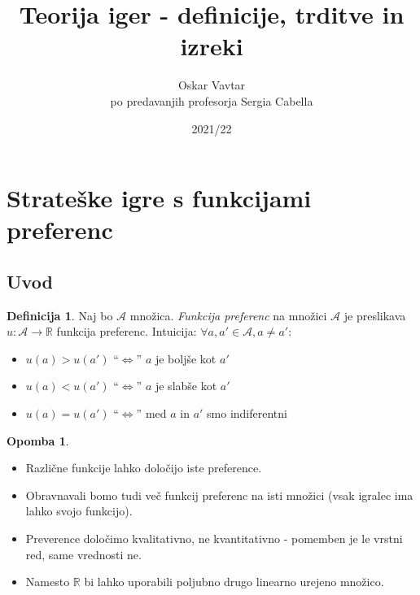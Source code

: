 \documentclass[11pt]{article}
\title{Teorija iger - definicije, trditve in izreki}
\author{Oskar Vavtar \\
po predavanjih profesorja Sergia Cabella}
\date{2021/22}
\newcommand{\R}{\mathbb{R}}
\newcommand{\A}{\mathscr{A}}
\newcommand{\1}{\mathbbm{1}}
\theoremstyle{definition}
\newtheorem{definicija}{Definicija}[section]
\theoremstyle{definition}
\theoremstyle{definition}
\theoremstyle{definition}
\newtheorem*{opomba}{Opomba}
\begin{document}
\maketitle
\pagebreak
\tableofcontents
\pagebreak


\section{Strateške igre s funkcijami preferenc}
\vspace{0.5cm}


\subsection{Uvod}
\vspace{0.5cm}

\begin{definicija}

Naj bo $\A$ množica. \textit{Funkcija preferenc} na množici $\A$ je preslikava $u: \A \rightarrow \R$ funkcija preferenc. Intuicija: $\forall a,a' \in \A, a \neq a'$:
\begin{itemize}
	\item $u(a)>u(a')$ ``$\iff$'' $a$ je boljše kot $a'$
	\item $u(a)<u(a')$ ``$\iff$'' $a$ je slabše kot $a'$
	\item $u(a)=u(a')$ ``$\iff$'' med $a$ in $a'$ smo indiferentni
\end{itemize}

\end{definicija}
\vspace{0.5cm}

\begin{opomba}
~
\begin{itemize}
	\item Različne funkcije lahko določijo iste preference.
	\item Obravnavali bomo tudi več funkcij preferenc na isti množici (vsak igralec ima lahko svojo funkcijo).
	\item Preverence določimo kvalitativno, ne kvantitativno - pomemben je le vrstni red, same vrednosti ne.
	\item Namesto $\R$ bi lahko uporabili poljubno drugo linearno urejeno množico.
\end{itemize}

\end{opomba} 
\vspace{0.5cm}
\end{document}
